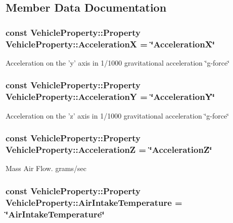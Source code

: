 \subsection{Member Data Documentation}
\hypertarget{classVehicleProperty_a94eac12d319850190e9ece93690517f7}{
\subsubsection[{Acceleration\-X}]{\setlength{\rightskip}{0pt plus 5cm}const Vehicle\-Property\-::\-Property Vehicle\-Property\-::\-Acceleration\-X = \char`\"{}Acceleration\-X\char`\"{}\hspace{0.3cm}{\ttfamily [static]}}}\label{classVehicleProperty_a94eac12d319850190e9ece93690517f7}
Acceleration on the 'y' axis in 1/1000 gravitational acceleration \char`\"{}g-\/force\char`\"{} \hypertarget{classVehicleProperty_af56803eeb7710aeae2954f4cd9b66cf6}{
\subsubsection[{Acceleration\-Y}]{\setlength{\rightskip}{0pt plus 5cm}const Vehicle\-Property\-::\-Property Vehicle\-Property\-::\-Acceleration\-Y = \char`\"{}Acceleration\-Y\char`\"{}\hspace{0.3cm}{\ttfamily [static]}}}\label{classVehicleProperty_af56803eeb7710aeae2954f4cd9b66cf6}
Acceleration on the 'z' axis in 1/1000 gravitational acceleration \char`\"{}g-\/force\char`\"{} \hypertarget{classVehicleProperty_a1ce0b3be3a09d5a96741890d0d67496f}{
\subsubsection[{Acceleration\-Z}]{\setlength{\rightskip}{0pt plus 5cm}const Vehicle\-Property\-::\-Property Vehicle\-Property\-::\-Acceleration\-Z = \char`\"{}Acceleration\-Z\char`\"{}\hspace{0.3cm}{\ttfamily [static]}}}\label{classVehicleProperty_a1ce0b3be3a09d5a96741890d0d67496f}
Mass Air Flow. grams/sec \hypertarget{classVehicleProperty_af4cbbae11228729335c50aa2d1fa2e28}{
\subsubsection[{Air\-Intake\-Temperature}]{\setlength{\rightskip}{0pt plus 5cm}const Vehicle\-Property\-::\-Property Vehicle\-Property\-::\-Air\-Intake\-Temperature = \char`\"{}Air\-Intake\-Temperature\char`\"{}\hspace{0.3cm}{\ttfamily [static]}}}\label{classVehicleProperty_af4cbbae11228729335c50aa2d1fa2e28}
